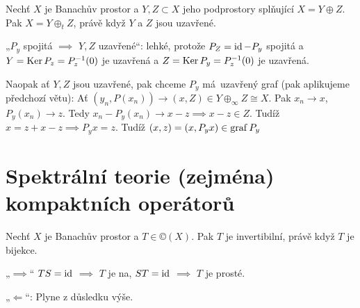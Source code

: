 \documentclass[12pt]{article}					%
\begin{document}
\begin{veta}
	Nechť $X$ je Banachův prostor a $Y, Z \subset X$ jeho podprostory splňující $X = Y \oplus Z$. Pak $X = Y\oplus_t Z$, právě když $Y$ a $Z$ jsou uzavřené.

	\begin{dukazin}
		„$P_y$ spojitá $\implies$ $Y, Z$ uzavřené“: lehké, protože $P_Z = \operatorname{id} - P_y$ spojitá a $Y = \operatorname{Ker} P_z = P_z^{-1}(0)$ je uzavřená a $Z = \operatorname{Ker} P_y = P_z^{-1}(0)$ je uzavřená.

		Naopak ať $Y, Z$ jsou uzavřené, pak chceme $P_y$ má uzavřený graf (pak aplikujeme předchozí větu): Ať $(y_n, P(x_n)) \rightarrow (x, Z) \in Y \oplus_∞ Z \cong X$. Pak $x_n \rightarrow x$, $P_y(x_n) \rightarrow z$. Tedy $x_n - P_y(x_n) \rightarrow x - z \implies x - z \in Z$. Tudíž $x = z + x - z \implies P_y x = z$. Tudíž $(x, z) = (x, P_yx) \in \operatorname{graf} P_y$
	\end{dukazin}
\end{veta}

\section{Spektrální teorie (zejména) kompaktních operátorů}
\begin{tvrzeni}
	Nechť $X$ je Banachův prostor a $T \in ©(X)$. Pak $T$ je invertibilní, právě když $T$ je bijekce.

	\begin{dukazin}
		„$\implies$“ $TS = \operatorname{id}$ $\implies$ $T$ je na, $ST = \operatorname{id}$ $\implies$ $T$ je prosté.

		„$\Leftarrow$“: Plyne z důsledku výše.
	\end{dukazin}
\end{tvrzeni}
\end{document}
